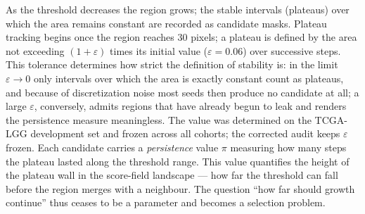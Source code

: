 \documentclass[11pt,a4paper]{article}
\begin{document}
As the threshold decreases the region grows; the stable intervals (plateaus) over
which the area remains constant are recorded as candidate masks. Plateau tracking
begins once the region reaches $30$ pixels; a plateau is defined by the area not
exceeding $(1+\varepsilon)$ times its initial value ($\varepsilon=0.06$) over
successive steps. This tolerance determines how strict the definition of stability
is: in the limit $\varepsilon\to0$ only intervals over which the area is exactly
constant count as plateaus, and because of discretization noise most seeds then
produce no candidate at all; a large $\varepsilon$, conversely, admits regions
that have already begun to leak and renders the persistence measure meaningless.
The value was determined on the TCGA-LGG development set and frozen across all
cohorts; the corrected audit keeps $\varepsilon$ frozen. Each
candidate carries a \emph{persistence} value $\pi$ measuring how many steps the
plateau lasted along the threshold range. This value quantifies the height of the
plateau wall in the score-field landscape --- how far the threshold can fall
before the region merges with a neighbour. The question ``how far should growth
continue'' thus ceases to be a parameter and becomes a selection problem.
\end{document}
